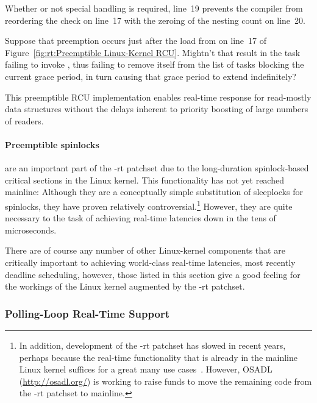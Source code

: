 Whether or not special handling is required, line~19 prevents the compiler
from reordering the check on line~17 with the zeroing of the nesting
count on line~20.

\QuickQuiz{}
	Suppose that preemption occurs just after the load from
	 on line~17 of
	Figure~\ref{fig:rt:Preemptible Linux-Kernel RCU}.
	Mightn't that result in the task failing to invoke
	, thus failing to remove itself
	from the list of tasks blocking the current grace period,
	in turn causing that grace period to extend indefinitely?
 \QuickQuizEnd

This preemptible RCU implementation enables real-time response for
read-mostly data structures without the delays inherent to priority
boosting of large numbers of readers.

\paragraph{Preemptible spinlocks}
are an important part of the -rt patchset due to the long-duration
spinlock-based critical sections in the Linux kernel.
This functionality has not yet reached mainline: Although they are a conceptually
simple substitution of sleeplocks for spinlocks, they have proven relatively
controversial.\footnote{
	In addition, development of the -rt patchset has slowed in recent
	years, perhaps because the real-time functionality that is already
	in the mainline Linux kernel suffices for a great many use
	cases~\cite{JakeEdge2013Future-rtLinux,JakeEdge2014Future-rtLinux}.
	However, OSADL (\url{http://osadl.org/}) is working to raise funds
	to move the remaining code from the -rt patchset to mainline.}
However, they are quite necessary to the task of achieving real-time
latencies down in the tens of microseconds.

There are of course any number of other Linux-kernel components that are
critically important to achieving world-class real-time latencies,
most recently deadline scheduling,
however, those listed in this section give a good feeling for the workings
of the Linux kernel augmented by the -rt patchset.

\subsubsection{Polling-Loop Real-Time Support}
\label{sec:rt:Polling-Loop Real-Time Support}

